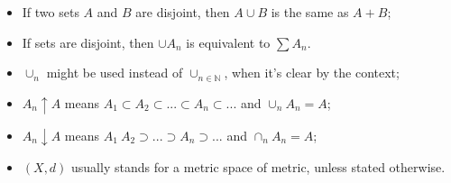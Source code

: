 \begin{itemize}
	\item If two sets $A$ and $B$ are disjoint, then $A\cup B$ is the same as $A+B$;
	\item If sets are disjoint, then $\cup A_n$ is equivalent to $\sum A_n$.
	\item $\cup_n$ might be used instead of $\cup_{n \in \mathbb N}$,
	      when it's clear by the context;
	\item $A_n \uparrow A$ means $A_1 \subset A_2 \subset ... \subset A_n \subset...$
	      and $\cup_n A_n =A$;
	\item $A_n \downarrow A$ means $A_1 \ A_2 \supset ... \supset A_n \supset...$
	      and $\cap_n A_n =A$;
	\item $(X,d)$ usually stands for a metric space of metric, unless stated otherwise.
\end{itemize}


